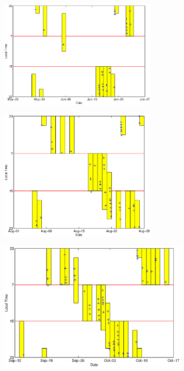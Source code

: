 \documentclass[a4paper,11pt]{article}
\begin{document}
\begin{figure}[htbp]
\begin{minipage}{1.0\hsize}
\begin{center}
\includegraphics[width =8cm]{PlotTime2011_1.eps}
\\
\end{center}
\end{minipage}
\begin{minipage}{1.0\hsize}
\begin{center}
\includegraphics[width =8cm]{PlotTime2011_2.eps}
\\
\end{center}
\end{minipage}
\begin{minipage}{1.0\hsize}
\begin{center}
\includegraphics[width =9.6cm]{PlotTime2011_3.eps}

\end{center}
\end{minipage}
\end{figure}
\end{document}
